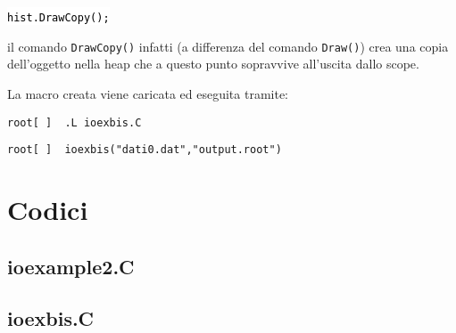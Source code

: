 \documentclass{article}
\newcommand{\ttt}{\texttt}
\newcommand{\tcpp}[1]{\hspace{10pt}\colorbox{background}{\textcolor{black}{\texttt{#1}}}}
\newcommand{\troot}[1]{\hspace{10pt}\colorbox{bashbackground}{\textcolor{bashtext}{\texttt{root[~]~~#1}}}}
\begin{document}
\tcpp{hist.DrawCopy();}

il comando \ttt{DrawCopy()} infatti (a differenza del comando \ttt{Draw()}) crea una copia dell'oggetto nella heap che a questo punto sopravvive all'uscita dallo scope.

La macro creata viene caricata ed eseguita tramite:

\vspace{5pt}

\troot{.L ioexbis.C}

\troot{ioexbis("dati0.dat","output.root")}


\newpage
\section{Codici}

\subsection{ioexample2.C}


\newpage

\subsection{ioexbis.C}

\end{document}
